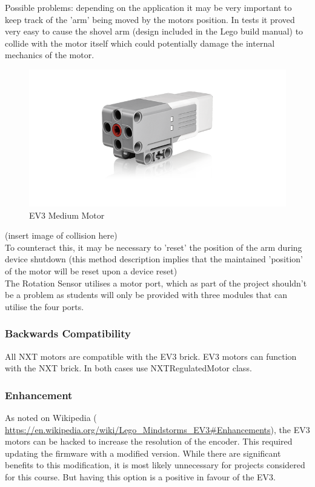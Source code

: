 \documentclass[11pt, a4paper, oneside]{article}
\begin{document}
		Possible problems: depending on the application it may be very important to keep track of the 'arm' being moved by the motors position. In tests it proved very easy to cause the shovel arm (design included in the Lego build manual) to collide with the motor itself which could potentially damage the internal mechanics of the motor.\\

		\begin{figure}[h!]
	  	\centering
	  	\includegraphics[scale=0.45]{img/EV3MediumMotor.png}
		\caption{EV3 Medium Motor}
		\end{figure}	
		
		(insert image of collision here)\\

		To counteract this, it may be necessary to 'reset' the position of the arm during device shutdown (this method description implies that the maintained 'position' of the motor will be reset upon a device reset)\\

		The Rotation Sensor utilises a motor port, which as part of the project shouldn't be a problem as students will only be provided with three modules that can utilise the four ports.

		\subsubsection{Backwards Compatibility}
		All NXT motors are compatible with the EV3 brick. EV3 motors can function with the NXT brick. In both cases use NXTRegulatedMotor class.
		
		\subsubsection{Enhancement}
		As noted on Wikipedia ( \url{https://en.wikipedia.org/wiki/Lego_Mindstorms_EV3#Enhancements}), the EV3 motors can be hacked to increase the resolution of the encoder. This required updating the firmware with a modified version. While there are significant benefits to this modification, it is most likely unnecessary for projects considered for this course. But having this option is a positive in favour of the EV3.		
		
\end{document}
